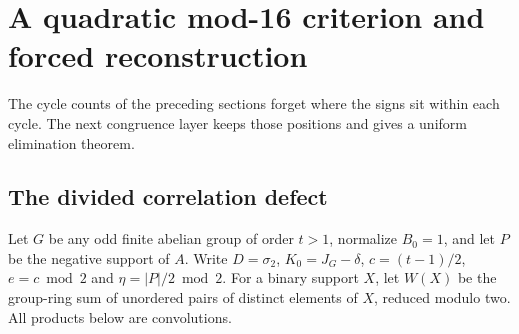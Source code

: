 \documentclass[11pt]{article}
\theoremstyle{definition}
\theoremstyle{remark}
\begin{document}
\section{A quadratic mod-16 criterion and forced reconstruction}\label{sec:phase}
The cycle counts of the preceding sections forget where the signs sit
within each cycle. The next congruence layer keeps those positions and
gives a uniform elimination theorem.

\subsection{The divided correlation defect}
Let $G$ be any odd finite abelian group of order $t>1$, normalize $B_0=1$,
and let $P$ be the negative support of $A$. Write $D=\sigma_2$,
$K_0=J_G-\delta$, $c=(t-1)/2$, $e=c\bmod2$ and
$\eta=|P|/2\bmod2$. For a binary support $X$, let $W(X)$ be the
group-ring sum of unordered pairs of distinct elements of $X$, reduced
modulo two. All products below are convolutions.
\end{document}
